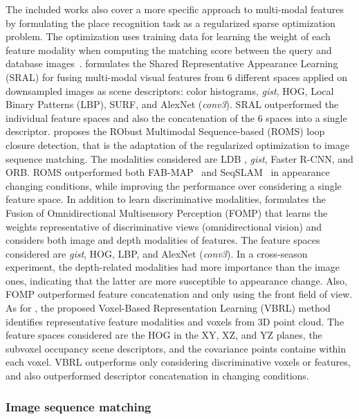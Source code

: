 The included works also cover a more specific approach to multi-modal features by formulating the place recognition task as a regularized sparse optimization problem. The optimization uses training data for learning the weight of each feature modality when computing the matching score between the query and database images~\parencite{han-et-al:2017:2662061,han-et-al:2018:3,siva-zhang:2018:8461042,siva-et-al:2020:9340992}.
\cite{han-et-al:2017:2662061} formulates the Shared Representative Appearance Learning (SRAL) for fusing multi-modal visual features from 6 different spaces applied on downsampled images as scene descriptors: color histograms, \textit{gist}, HOG, Local Binary Patterns (LBP), SURF, and AlexNet (\textit{conv3}). SRAL outperformed the individual feature spaces and also the concatenation of the 6 spaces into a single descriptor.
\cite{han-et-al:2018:3} proposes the RObust Multimodal Sequence-based (ROMS) loop closure detection, that is the adaptation of the regularized optimization to image sequence matching. The modalities considered are LDB \parencite{arroyo-et-al:2018:7}, \textit{gist}, Faster R-CNN, and ORB. ROMS outperformed both FAB-MAP~\parencite{discussion:fab-map} and SeqSLAM~\parencite{discussion:seqslam} in appearance changing conditions, while improving the performance over considering a single feature space.
In addition to learn discriminative modalities, \cite{siva-zhang:2018:8461042} formulates the Fusion of Omnidirectional Multisensory Perception (FOMP) that learns the weights representative of discriminative views (omnidirectional vision) and considers both image and depth modalities of features. The feature spaces considered are \textit{gist}, HOG, LBP, and AlexNet (\textit{conv3}). In a cross-season experiment, the depth-related modalities had more importance than the image ones, indicating that the latter are more susceptible to appearance change. Also, FOMP outperformed feature concatenation and only using the front field of view.
As for \cite{siva-et-al:2020:9340992}, the proposed Voxel-Based Representation Learning (VBRL) method identifies representative feature modalities and voxels from 3D point cloud. The feature spaces considered are the HOG in the XY, XZ, and YZ planes, the subvoxel occupancy scene descriptors, and the covariance points containe within each voxel. VBRL outperforms only considering discriminative voxels or features, and also outperformed descriptor concatenation in changing conditions.



\subsubsection{Image sequence matching}

